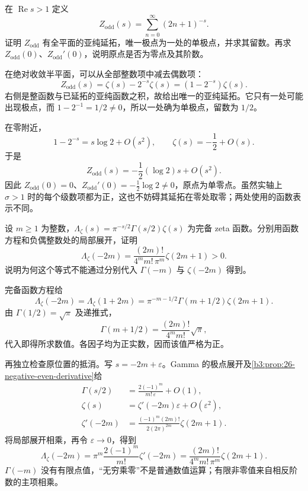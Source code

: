 \begin{exercise}\label{b3:ex:26-1}
在 \(\operatorname{Re}s>1\) 定义
\[
 Z_{\mathrm{odd}}(s)=\sum_{n=0}^{\infty}(2n+1)^{-s}.
\]
证明 \(Z_{\mathrm{odd}}\) 有全平面的亚纯延拓，唯一极点为一处的单极点，并求其留数。再求 \(Z_{\mathrm{odd}}(0)\)、\(Z_{\mathrm{odd}}'(0)\)，说明原点是否为零点及其阶数。
\end{exercise}
\begin{solution}
在绝对收敛半平面，可以从全部整数项中减去偶数项：
\[
 Z_{\mathrm{odd}}(s)=\zeta(s)-2^{-s}\zeta(s)
                  =(1-2^{-s})\zeta(s).
\]
右侧是整函数与已延拓的亚纯函数之积，故给出唯一的亚纯延拓。它只有一处可能出现极点，而 \(1-2^{-1}=1/2\ne0\)，所以一处确为单极点，留数为 \(1/2\)。

在零附近，
\[
 1-2^{-s}=s\log2+O(s^2),\qquad
 \zeta(s)=-\frac12+O(s).
\]
于是
\[
 Z_{\mathrm{odd}}(s)=-\frac12(\log2)s+O(s^2).
\]
因此 \(Z_{\mathrm{odd}}(0)=0\)、\(Z_{\mathrm{odd}}'(0)=-\tfrac12\log2\ne0\)，原点为单零点。虽然实轴上 \(\sigma>1\) 时的每个级数项都为正，这也不妨碍其延拓在零处取零；两处使用的函数表示不同。
\end{solution}

\begin{exercise}\label{b3:ex:26-2}
设 \(m\ge1\) 为整数，\(\Lambda_\zeta(s)=\pi^{-s/2}\Gamma(s/2)\zeta(s)\) 为完备 zeta 函数。分别用函数方程和负偶整数处的局部展开，证明
\[
 \Lambda_\zeta(-2m)
 =\frac{(2m)!}{4^m m!\,\pi^m}\zeta(2m+1)>0.
\]
说明为何这个等式不能通过分别代入 \(\Gamma(-m)\) 与 \(\zeta(-2m)\) 得到。
\end{exercise}
\begin{solution}
完备函数方程给
\[
 \Lambda_\zeta(-2m)=\Lambda_\zeta(1+2m)
 =\pi^{-m-1/2}\Gamma(m+1/2)\zeta(2m+1).
\]
由 \(\Gamma(1/2)=\sqrt\pi\) 及递推式，
\[
 \Gamma(m+1/2)=\frac{(2m)!}{4^m m!}\sqrt\pi,
\]
代入即得所求数值。各因子均为正实数，因而该值严格为正。

再独立检查原位置的抵消。写 \(s=-2m+\varepsilon\)。Gamma 的极点展开及\cref{b3:prop:26-negative-even-derivative}给
\[
 \begin{aligned}
 \Gamma(s/2)&=\frac{2(-1)^m}{m!\,\varepsilon}+O(1),\\
 \zeta(s)&=\zeta'(-2m)\varepsilon+O(\varepsilon^2),\\
 \zeta'(-2m)&=\frac{(-1)^m(2m)!}{2(2\pi)^{2m}}\zeta(2m+1).
 \end{aligned}
\]
将局部展开相乘，再令 \(\varepsilon\to0\)，得到
\[
 \Lambda_\zeta(-2m)
 =\pi^m\frac{2(-1)^m}{m!}\zeta'(-2m)
 =\frac{(2m)!}{4^m m!\,\pi^m}\zeta(2m+1).
\]
\(\Gamma(-m)\) 没有有限点值，“无穷乘零”不是普通数值运算；有限非零值来自相反阶数的主项相乘。
\end{solution}

